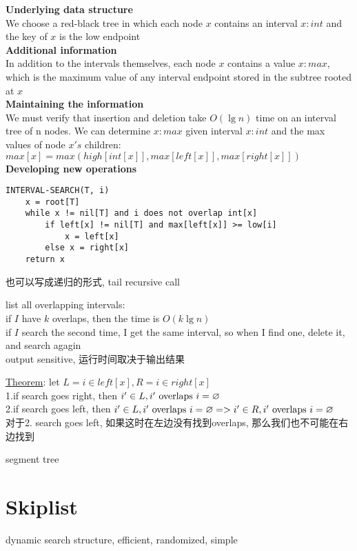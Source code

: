 \documentclass{article}
\begin{document}
\bigskip
\textbf{Underlying data structure}\\
We choose a red-black tree in which each node $x$ contains an interval $x:int$ and the key of $x$ is the low endpoint\\
\textbf{Additional information}\\
In addition to the intervals themselves, each node $x$ contains a value $x:max$, which is the maximum value of any interval endpoint stored in the subtree rooted at $x$\\
\textbf{Maintaining the information}\\
We must verify that insertion and deletion take $O(\lg n)$ time on an interval tree of n nodes. We can determine $x:max$ given interval $x:int$ and the max values of node $x's$ children:\\
$max[x] = max(high[int[x]], max[left[x]], max[right[x]])$\\
\textbf{Developing new operations}
\begin{verbatim}
INTERVAL-SEARCH(T, i)
    x = root[T]
    while x != nil[T] and i does not overlap int[x]
        if left[x] != nil[T] and max[left[x]] >= low[i]
            x = left[x]
        else x = right[x]
    return x
\end{verbatim}
也可以写成递归的形式, tail recursive call

\bigskip
\noindent list all overlapping intervals:\\
if $I$ have $k$ overlaps, then the time is $O(k\lg n)$\\
if $I$ search the second time, I get the same interval, so when I find one, delete it, and search agagin\\
output sensitive, 运行时间取决于输出结果

\bigskip
\noindent \underline{Theorem}: let $L = {i \in left[x]}, R = {i \in right[x]}$\\
1.if search goes right, then ${i' \in L, i' \text{ overlaps } i} = \varnothing$\\
2.if search goes left, then ${i' \in L, i' \text{ overlaps } i} = \varnothing => {i' \in R, i' \text{ overlaps } i} = \varnothing$\\
对于2. search goes left, 如果这时在左边没有找到overlaps, 那么我们也不可能在右边找到

\bigskip
segment tree

\section{Skiplist}
dynamic search structure, efficient, randomized, simple
\end{document}
